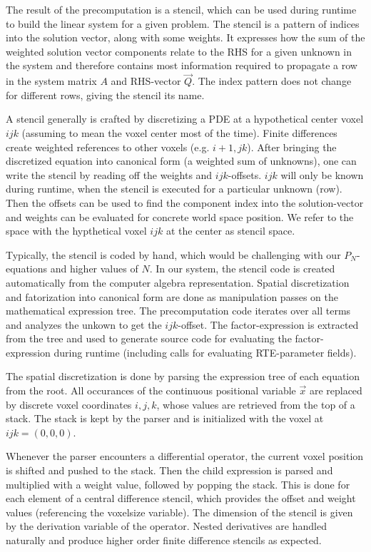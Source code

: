 The result of the precomputation is a stencil, which can be used during runtime to build the linear system for a given problem. The stencil is a pattern of indices into the solution vector, along with some weights. It expresses how the sum of the weighted solution vector components relate to the RHS for a given unknown in the system and therefore contains most information required to propagate a row in the system matrix $A$ and RHS-vector $\vec{Q}$. The index pattern does not change for different rows, giving the stencil its name.

A stencil generally is crafted by discretizing a PDE at a hypothetical center voxel $ijk$ (assuming to mean the voxel center most of the time). Finite differences create weighted references to other voxels (e.g. $i+1,jk$). After bringing the discretized equation into canonical form (a weighted sum of unknowns), one can write the stencil by reading off the weights and $ijk$-offsets. $ijk$ will only be known during runtime, when the stencil is executed for a particular unknown (row). Then the offsets can be used to find the component index into the solution-vector and weights can be evaluated for concrete world space position. We refer to the space with the hypthetical voxel $ijk$ at the center as stencil space.

Typically, the stencil is coded by hand, which would be challenging with our $P_N$-equations and higher values of $N$. In our system, the stencil code is created automatically from the computer algebra representation. Spatial discretization and fatorization into canonical form are done as manipulation passes on the mathematical expression tree. The precomputation code iterates over all terms and analyzes the unkown to get the $ijk$-offset. The factor-expression is extracted from the tree and used to generate source code for evaluating the factor-expression during runtime (including calls for evaluating RTE-parameter fields).

The spatial discretization is done by parsing the expression tree of each equation from the root. All occurances of the continuous positional variable $\vec{x}$ are replaced by discrete voxel coordinates $i,j,k$, whose values are retrieved from the top of a stack. The stack is kept by the parser and is initialized with the voxel at $ijk=(0,0,0)$.

Whenever the parser encounters a differential operator, the current voxel position is shifted and pushed to the stack. Then the child expression is parsed and multiplied with a weight value, followed by popping the stack. This is done for each element of a central difference stencil, which provides the offset and weight values (referencing the voxelsize variable). The dimension of the stencil is given by the derivation variable of the operator. Nested derivatives are handled naturally and produce higher order finite difference stencils as expected.

